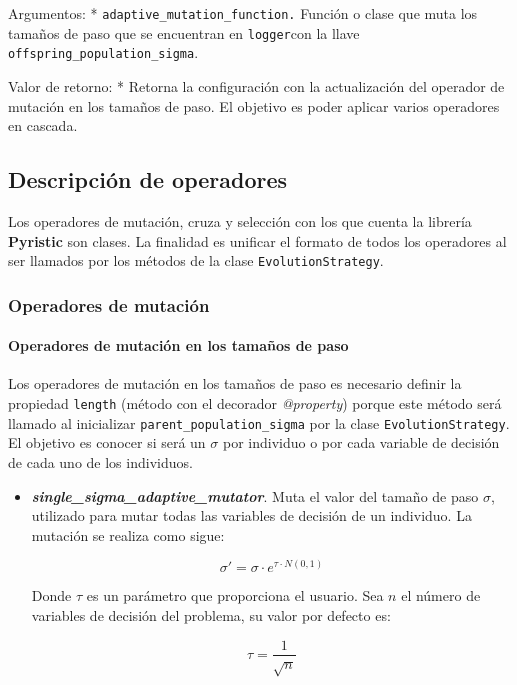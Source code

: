 \documentclass[11pt]{article}
\providecommand{\tightlist}{%
      \setlength{\itemsep}{0pt}\setlength{\parskip}{0pt}}
\begin{document}
Argumentos: * \texttt{adaptive\_mutation\_function.} Función o clase que
muta los tamaños de paso que se encuentran en \texttt{logger}con la
llave \texttt{offspring\_population\_sigma}.

Valor de retorno: * Retorna la configuración con la actualización del
operador de mutación en los tamaños de paso. El objetivo es poder
aplicar varios operadores en cascada.

    \subsection{Descripción de
operadores}\label{descripciuxf3n-de-operadores}

Los operadores de mutación, cruza y selección con los que cuenta la
librería \textbf{Pyristic} son clases. La finalidad es unificar el
formato de todos los operadores al ser llamados por los métodos de la
clase \texttt{EvolutionStrategy}.

    \subsubsection{Operadores de mutación}\label{operadores-de-mutaciuxf3n}

    \paragraph{Operadores de mutación en los tamaños de
paso}\label{operadores-de-mutaciuxf3n-en-los-tamauxf1os-de-paso}

Los operadores de mutación en los tamaños de paso es necesario definir
la propiedad \texttt{length} (método con el decorador \emph{@property})
porque este método será llamado al inicializar
\texttt{parent\_population\_sigma} por la clase
\texttt{EvolutionStrategy}. El objetivo es conocer si será un \(\sigma\)
por individuo o por cada variable de decisión de cada uno de los
individuos.

    \begin{itemize}
\tightlist
\item
  \emph{\textbf{single\_sigma\_adaptive\_mutator}}. Muta el valor del
  tamaño de paso \(\sigma\), utilizado para mutar todas las variables de
  decisión de un individuo. La mutación se realiza como sigue:

  \begin{equation}
   \sigma' = \sigma \cdot e^{\tau \cdot N(0,1)}
  \end{equation}

  Donde \(\tau\) es un parámetro que proporciona el usuario. Sea \(n\)
  el número de variables de decisión del problema, su valor por defecto
  es:

  \begin{equation}
     \tau = \frac{1}{\sqrt{n}}
    \end{equation}
\end{itemize}
\end{document}
